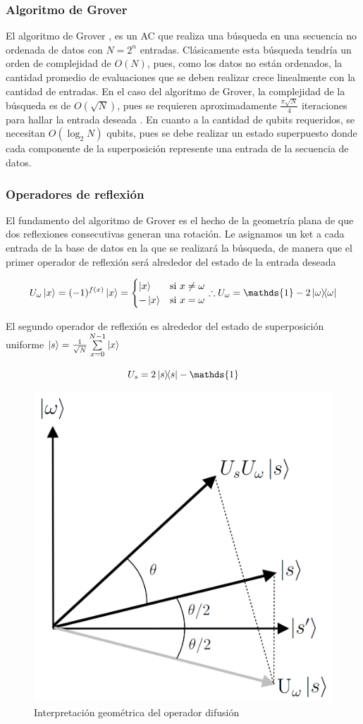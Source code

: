 \documentclass[xetex,mathserif,serif, 8pt]{beamer}
\begin{document}
\begin{frame}
    \frametitle{Algoritmo de Grover}

    \justify
    El algoritmo de Grover \cite{Grover_1996}, es un AC que realiza una búsqueda en una secuencia no ordenada de datos con $N=2^n$ entradas. Clásicamente esta búsqueda tendría un orden de complejidad de $O(N)$, pues, como los datos no están ordenados, la cantidad promedio de evaluaciones que se deben realizar crece linealmente con la cantidad de entradas. En el caso del algoritmo de Grover, la complejidad de la búsqueda es de $O(\sqrt{N})$, pues se requieren aproximadamente $\frac{\pi\sqrt{N}}{4}$ iteraciones para hallar la entrada deseada \cite{Grover_1996}. En cuanto a la cantidad de qubits requeridos, se necesitan $O(\log_2 N)$ qubits, pues se debe realizar un estado superpuesto donde cada componente de la superposición represente una entrada de la secuencia de datos.

\end{frame}
	
\begin{frame}
    \frametitle{Operadores de reflexión}

    El fundamento del algoritmo de Grover es el hecho de la geometría plana de que dos reflexiones consecutivas generan una rotación. Le asignamos un ket a cada entrada de la base de datos en la que se realizará la búsqueda, de manera que el primer operador de reflexión será alrededor del estado de la entrada deseada

    \begin{equation}
        U_\omega \ket{x} = (-1)^{f(x)} \ket{x} =
        \begin{cases}
            \ket{x} & \text{si } x \neq \omega \\
            - \ket{x} & \text{si } x = \omega
        \end{cases} \therefore U_\omega = \mathds{1} - 2 \ketbra{\omega}{\omega}
    \end{equation}

    El segundo operador de reflexión es alrededor del estado de superposición uniforme $\ket{s} = \frac{1}{\sqrt{N}} \sum\limits_{x=0}^{N-1} \ket{x}$

    \vspace{-0.5cm}
    \begin{equation}
        U_s = 2 \ketbra{s} - \mathds{1}
    \end{equation}

    \begin{figure}[H]
    \centering \includegraphics[width=0.25\linewidth]{img/grover_geometry.png}
    \caption{Interpretación geométrica del operador difusión}
    \label{fig:groverdifusion}
    \end{figure}

\end{frame}
\end{document}
